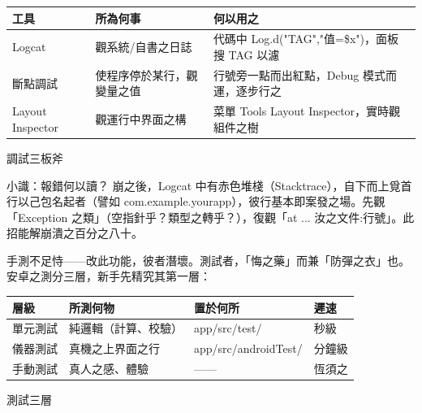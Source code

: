 


\begin{center}
\begin{tabularx}{\linewidth}{|X|X|X|}
\hline
\textbf{工具} & \textbf{所為何事} & \textbf{何以用之} \tabularnewline
\hline
Logcat & 觀系統/自書之日誌 & 代碼中 Log.d("TAG","值=\$x")，面板搜 TAG 以濾 \tabularnewline
斷點調試 & 使程序停於某行，觀變量之值 & 行號旁一點而出紅點，Debug 模式而運，逐步行之 \tabularnewline
Layout Inspector & 觀運行中界面之構 & 菜單 Tools Layout Inspector，實時觀組件之樹 \tabularnewline
\hline
\end{tabularx}
\end{center}

\begin{center}\small\color{gray}調試三板斧\end{center}

\begin{tcbinfo}{小識：報錯何以讀？}
崩之後，Logcat 中有赤色堆棧（Stacktrace），自下而上覓首行以己包名起者（譬如 com.example.yourapp），彼行基本即案發之場。先觀「Exception 之類」（空指針乎？類型之轉乎？），復觀「at ... 汝之文件:行號」。此招能解崩潰之百分之八十。

\end{tcbinfo}


手測不足恃——改此功能，彼者潛壞。測試者，「悔之藥」而兼「防彈之衣」也。安卓之測分三層，新手先精究其第一層：

\begin{center}
\begin{tabularx}{\linewidth}{|X|X|X|X|}
\hline
\textbf{層級} & \textbf{所測何物} & \textbf{置於何所} & \textbf{遲速} \tabularnewline
\hline
單元測試 & 純邏輯（計算、校驗） & app/src/test/ & 秒級 \tabularnewline
儀器測試 & 真機之上界面之行 & app/src/androidTest/ & 分鐘級 \tabularnewline
手動測試 & 真人之感、體驗 & —— & 恆須之 \tabularnewline
\hline
\end{tabularx}
\end{center}

\begin{center}\small\color{gray}測試三層\end{center}

